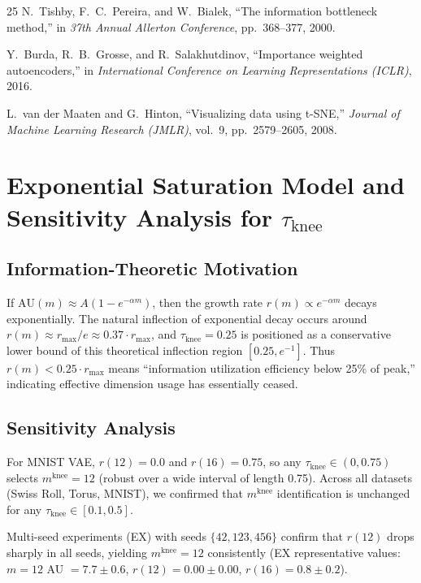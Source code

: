 \documentclass[lettersize,journal]{IEEEtran}
\begin{document}
\begin{thebibliography}{25}
N.~Tishby, F.~C.~Pereira, and W.~Bialek,
``The information bottleneck method,''
in \textit{37th Annual Allerton Conference}, pp.~368--377, 2000.

Y.~Burda, R.~B.~Grosse, and R.~Salakhutdinov,
``Importance weighted autoencoders,''
in \textit{International Conference on Learning Representations (ICLR)}, 2016.

L.~van der Maaten and G.~Hinton,
``Visualizing data using t-SNE,''
\textit{Journal of Machine Learning Research (JMLR)}, vol.~9,
pp.~2579--2605, 2008.

\end{thebibliography}

\appendices

\section{Exponential Saturation Model and Sensitivity Analysis for $\tau_\mathrm{knee}$}\label{app:tau_knee}

\subsection*{Information-Theoretic Motivation}

If $\mathrm{AU}(m) \approx A(1 - e^{-\alpha m})$, then the growth rate $r(m) \propto e^{-\alpha m}$ decays exponentially.
The natural inflection of exponential decay occurs around $r(m) \approx r_\mathrm{max}/e \approx 0.37 \cdot r_\mathrm{max}$, and $\tau_\mathrm{knee} = 0.25$ is positioned as a conservative lower bound of this theoretical inflection region $[0.25, e^{-1}]$.
Thus $r(m) < 0.25 \cdot r_\mathrm{max}$ means ``information utilization efficiency below 25\% of peak,'' indicating effective dimension usage has essentially ceased.

\subsection*{Sensitivity Analysis}

For MNIST VAE, $r(12) = 0.0$ and $r(16) = 0.75$, so any $\tau_\mathrm{knee} \in (0, 0.75)$ selects $m^\mathrm{knee} = 12$ (robust over a wide interval of length 0.75).
Across all datasets (Swiss Roll, Torus, MNIST), we confirmed that $m^\mathrm{knee}$ identification is unchanged for any $\tau_\mathrm{knee} \in [0.1, 0.5]$.

Multi-seed experiments (EX) with seeds $\{42, 123, 456\}$ confirm that $r(12)$ drops sharply in all seeds, yielding $m^\mathrm{knee} = 12$ consistently (EX representative values: $m=12$ AU $= 7.7\pm0.6$, $r(12) = 0.00\pm0.00$, $r(16) = 0.8\pm0.2$).
\end{document}
